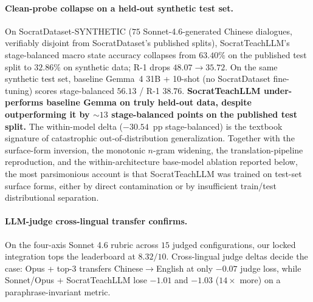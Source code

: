 \documentclass[11pt]{article}
\begin{document}
\paragraph{Clean-probe collapse on a held-out synthetic test set.} On SocratDataset-SYNTHETIC ($75$ Sonnet-4.6-generated Chinese dialogues, verifiably disjoint from SocratDataset's published splits), SocratTeachLLM's stage-balanced macro state accuracy collapses from $\mathbf{63.40\%}$ on the published test split to $\mathbf{32.86\%}$ on synthetic data; R-1 drops $48.07\to35.72$. On the same synthetic test set, baseline Gemma~4 31B + 10-shot (no SocratDataset fine-tuning) scores stage-balanced $56.13$ / R-1 $38.76$. \textbf{SocratTeachLLM under-performs baseline Gemma on truly held-out data, despite outperforming it by $\sim$$13$ stage-balanced points on the published test split.} The within-model delta ($-30.54$~pp stage-balanced) is the textbook signature of catastrophic out-of-distribution generalization. Together with the surface-form inversion, the monotonic $n$-gram widening, the translation-pipeline reproduction, and the within-architecture base-model ablation reported below, the most parsimonious account is that SocratTeachLLM was trained on test-set surface forms, either by direct contamination or by insufficient train/test distributional separation.

\paragraph{LLM-judge cross-lingual transfer confirms.} On the four-axis Sonnet 4.6 rubric across $15$ judged configurations, our locked integration tops the leaderboard at $8.32/10$. Cross-lingual judge deltas decide the case: Opus + top-3 transfers Chinese$\to$English at only $-0.07$ judge loss, while Sonnet/Opus + SocratTeachLLM lose $-1.01$ and $-1.03$ ($14\times$ more) on a paraphrase-invariant metric.
\end{document}
